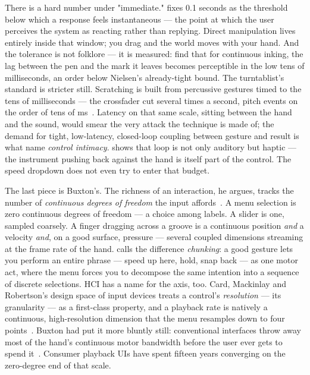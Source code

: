 \documentclass[10pt,letterpaper,twocolumn]{article}
\begin{document}
There is a hard number under "immediate." \citet{nielsen1993usability} fixes 0.1 seconds as the threshold below which a response feels instantaneous --- the point at which the user perceives the system as reacting rather than replying. Direct manipulation lives entirely inside that window; you drag and the world moves with your hand. And the tolerance is not folklore --- it is measured: \citet{annett2014low} find that for continuous inking, the lag between the pen and the mark it leaves becomes perceptible in the low tens of milliseconds, an order below Nielsen's already-tight bound. The turntablist's standard is stricter still. Scratching is built from percussive gestures timed to the tens of milliseconds --- the crossfader cut several times a second, pitch events on the order of tens of ms~\citep{hansen2010scratching}. Latency on that same scale, sitting between the hand and the sound, would smear the very attack the technique is made of; the demand for tight, low-latency, closed-loop coupling between gesture and result is what \citet{wessel2002intimate} name \emph{control intimacy}. \citet{omodhrain2000playing} shows that loop is not only auditory but haptic --- the instrument pushing back against the hand is itself part of the control. The speed dropdown does not even try to enter that budget.

The last piece is Buxton's. The richness of an interaction, he argues, tracks the number of \emph{continuous degrees of freedom} the input affords~\citep{buxton2007multitouch,buxton2018gesture}. A menu selection is zero continuous degrees of freedom --- a choice among labels. A slider is one, sampled coarsely. A finger dragging across a groove is a continuous position \emph{and} a velocity \emph{and}, on a good surface, pressure --- several coupled dimensions streaming at the frame rate of the hand. \citet{buxton1986chunking} calls the difference \emph{chunking}: a good gesture lets you perform an entire phrase --- speed up here, hold, snap back --- as one motor act, where the menu forces you to decompose the same intention into a sequence of discrete selections. HCI has a name for the axis, too. Card, Mackinlay and Robertson's design space of input devices treats a control's \emph{resolution} --- its granularity --- as a first-class property, and a playback rate is natively a continuous, high-resolution dimension that the menu resamples down to four points~\citep{card1991morphological}. Buxton had put it more bluntly still: conventional interfaces throw away most of the hand's continuous motor bandwidth before the user ever gets to spend it~\citep{buxton1986more}. Consumer playback UIs have spent fifteen years converging on the zero-degree end of that scale.
\end{document}
